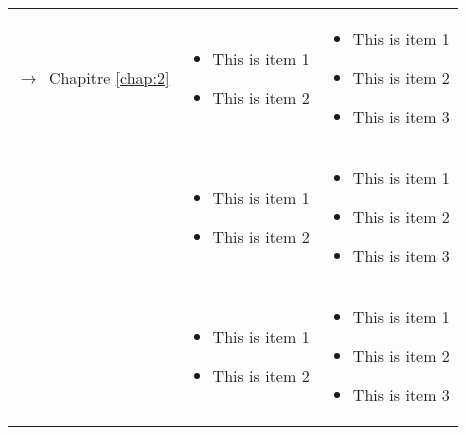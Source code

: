 \begin{tabular}{L{.2\textheight}L{.35\textheight}L{.35\textheight}}
  {\par\footnotesize\hspace{.25cm}$\longrightarrow$~Chapitre \ref{chap:2}}
& \begin{minipage}{.35\textheight}
    \begin{itemize}
    \item This is item 1
    \item This is item 2
    \end{itemize}
  \end{minipage}& \begin{minipage}{.35\textheight}
    \begin{itemize}
    \item This is item 1
    \item This is item 2
    \item This is item 3
    \end{itemize}
  \end{minipage} \\
& \begin{minipage}{.35\textheight}
    \begin{itemize}
    \item This is item 1
    \item This is item 2
    \end{itemize}
  \end{minipage}& \begin{minipage}{.35\textheight}
    \begin{itemize}
    \item This is item 1
    \item This is item 2
    \item This is item 3
    \end{itemize}
  \end{minipage} \\
& \begin{minipage}{.35\textheight}
    \begin{itemize}
    \item This is item 1
    \item This is item 2
    \end{itemize}
  \end{minipage}& \begin{minipage}{.35\textheight}
    \begin{itemize}
    \item This is item 1
    \item This is item 2
    \item This is item 3
    \end{itemize}
  \end{minipage}\\
  
  \bottomrule
\end{tabular}
